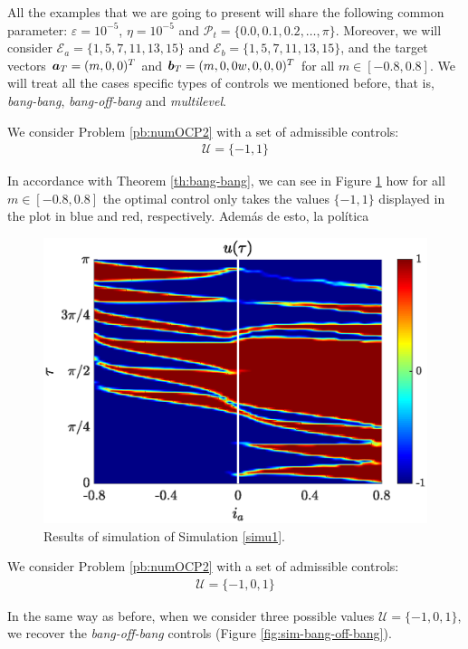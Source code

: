 \documentclass[twocolumn]{autart}    %
\begin{document}
All the examples that we are going to present will share the following common parameter: $\varepsilon = 10^{-5}$, $\eta = 10^{-5}$ and $\mathcal{P}_t = \{0.0 , 0.1, 0.2 ,\dots,\pi\}$. Moreover, we will consider $\mathcal{E}_a = \{1,5,7,11,13,15\}$ and  $\mathcal{E}_b = \{1,5,7,11,13,15\}$, and the target vectors $\bm{a}_T = (m,0,0)^T$ and $\bm{b}_T = (m,0,0w,0,0,0)^T$ for all $m \in [-0.8,0.8]$. We will treat all the cases specific types of controls we mentioned before, that is, \emph{bang-bang}, \emph{bang-off-bang} and \textit{multilevel}. 

\vspace{1em}
\begin{simulation}\label{simu1}
We consider Problem \ref{pb:numOCP2} with a set of admissible controls:
\begin{align*}
    \mathcal{U} = \{-1,1\}
\end{align*}
\end{simulation}
In accordance with Theorem \ref{th:bang-bang}, we can see in Figure \ref{fig:sim-bang-bang} how for all $m \in [-0.8,0.8]$ the optimal control only takes the values $\{-1,1\}$ displayed in the plot in blue and red, respectively. Además de esto, la política 
\begin{figure}[ht!]
    \hspace{0.05em}
    \includegraphics[scale=0.525]{img/fig05.eps}
    \caption{Results of simulation of Simulation \ref{simu1}.}\label{fig:sim-bang-bang}
\end{figure} 

\vspace{1em}
\begin{simulation}\label{simu2}
We consider Problem \ref{pb:numOCP2} with a set of admissible controls:
\begin{align*}
	\mathcal{U} = \{-1,0,1\}
\end{align*}
\end{simulation}
In the same way as before, when we consider three possible values $\mathcal U = \{-1,0,1\}$, we recover the \emph{bang-off-bang} controls (Figure \ref{fig:sim-bang-off-bang}).
\end{document}
